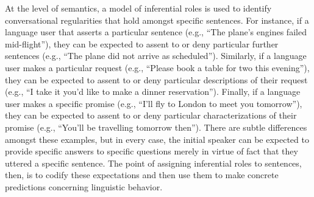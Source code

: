 At the level of semantics, a model of inferential roles is used to identify conversational regularities that hold amongst specific sentences. For instance, if a language user that asserts a particular sentence (e.g., ``The plane's engines failed mid-flight''), they can be expected to assent to or deny particular further sentences (e.g., ``The plane did not arrive as scheduled''). Similarly, if a language user makes a particular request (e.g., ``Please book a table for two this evening''), they can be expected to assent to or deny particular descriptions of their request (e.g., ``I take it you'd like to make a dinner reservation''). Finally, if a language user makes a specific promise (e.g., ``I'll fly to London to meet you tomorrow''), they can be expected to assent to or deny particular characterizations of their promise (e.g., ``You'll be travelling tomorrow then''). There are subtle differences amongst these examples, but in every case, the initial speaker can be expected to provide specific answers to specific questions merely in virtue of fact that they uttered a specific sentence. The point of assigning inferential roles to sentences, then, is to codify these expectations and then use them to make concrete predictions concerning linguistic behavior. 

